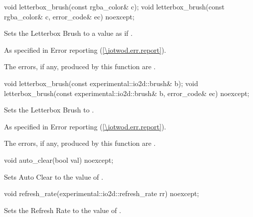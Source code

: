 \begin{itemdecl}
void letterbox_brush(const rgba_color& c);
void letterbox_brush(const rgba_color& c, error_code& ec) noexcept;
\end{itemdecl}
\begin{itemdescr}
\pnum
\effects
Sets the Letterbox Brush to a value as if .

\pnum
\throws
As specified in Error reporting (\ref{\iotwod.err.report}).

\pnum
\errors
The errors, if any, produced by this function are .
\end{itemdescr}

\begin{itemdecl}
void letterbox_brush(const experimental::io2d::brush& b);
void letterbox_brush(const experimental::io2d::brush& b, error_code& ec) 
  noexcept;
\end{itemdecl}
\begin{itemdescr}
\pnum
\effects
Sets the Letterbox Brush to .

\pnum
\throws
As specified in Error reporting (\ref{\iotwod.err.report}).

\pnum
\errors
The errors, if any, produced by this function are .
\end{itemdescr}

\begin{itemdecl}
void auto_clear(bool val) noexcept;
\end{itemdecl}
\begin{itemdescr}
\pnum
\effects
Sets Auto Clear to the value of .
\end{itemdescr}

\begin{itemdecl}
void refresh_rate(experimental::io2d::refresh_rate rr) noexcept;
\end{itemdecl}
\begin{itemdescr}
\pnum
\effects
Sets the Refresh Rate to the value of .
\end{itemdescr}

